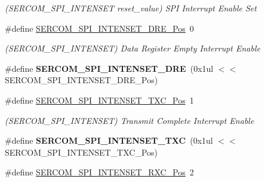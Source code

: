 \begin{DoxyCompactItemize}
\begin{DoxyCompactList}\small\item\em (S\+E\+R\+C\+O\+M\+\_\+\+S\+P\+I\+\_\+\+I\+N\+T\+E\+N\+S\+E\+T reset\+\_\+value) S\+P\+I Interrupt Enable Set \end{DoxyCompactList}\item 
\hypertarget{group___s_a_m_l21___s_e_r_c_o_m_ga4d3dd9b4afaf166511e045cfa97c93e8}{}\#define \hyperlink{group___s_a_m_l21___s_e_r_c_o_m_ga4d3dd9b4afaf166511e045cfa97c93e8}{S\+E\+R\+C\+O\+M\+\_\+\+S\+P\+I\+\_\+\+I\+N\+T\+E\+N\+S\+E\+T\+\_\+\+D\+R\+E\+\_\+\+Pos}~0\label{group___s_a_m_l21___s_e_r_c_o_m_ga4d3dd9b4afaf166511e045cfa97c93e8}

\begin{DoxyCompactList}\small\item\em (S\+E\+R\+C\+O\+M\+\_\+\+S\+P\+I\+\_\+\+I\+N\+T\+E\+N\+S\+E\+T) Data Register Empty Interrupt Enable \end{DoxyCompactList}\item 
\hypertarget{group___s_a_m_l21___s_e_r_c_o_m_ga59f60265759e811922af7763f5d8219c}{}\#define {\bfseries S\+E\+R\+C\+O\+M\+\_\+\+S\+P\+I\+\_\+\+I\+N\+T\+E\+N\+S\+E\+T\+\_\+\+D\+R\+E}~(0x1ul $<$$<$ S\+E\+R\+C\+O\+M\+\_\+\+S\+P\+I\+\_\+\+I\+N\+T\+E\+N\+S\+E\+T\+\_\+\+D\+R\+E\+\_\+\+Pos)\label{group___s_a_m_l21___s_e_r_c_o_m_ga59f60265759e811922af7763f5d8219c}

\item 
\hypertarget{group___s_a_m_l21___s_e_r_c_o_m_ga41d273616f164fcb7126e894fb240a50}{}\#define \hyperlink{group___s_a_m_l21___s_e_r_c_o_m_ga41d273616f164fcb7126e894fb240a50}{S\+E\+R\+C\+O\+M\+\_\+\+S\+P\+I\+\_\+\+I\+N\+T\+E\+N\+S\+E\+T\+\_\+\+T\+X\+C\+\_\+\+Pos}~1\label{group___s_a_m_l21___s_e_r_c_o_m_ga41d273616f164fcb7126e894fb240a50}

\begin{DoxyCompactList}\small\item\em (S\+E\+R\+C\+O\+M\+\_\+\+S\+P\+I\+\_\+\+I\+N\+T\+E\+N\+S\+E\+T) Transmit Complete Interrupt Enable \end{DoxyCompactList}\item 
\hypertarget{group___s_a_m_l21___s_e_r_c_o_m_ga9d9ea8d0b5aa9d3760a9ac8c937d0715}{}\#define {\bfseries S\+E\+R\+C\+O\+M\+\_\+\+S\+P\+I\+\_\+\+I\+N\+T\+E\+N\+S\+E\+T\+\_\+\+T\+X\+C}~(0x1ul $<$$<$ S\+E\+R\+C\+O\+M\+\_\+\+S\+P\+I\+\_\+\+I\+N\+T\+E\+N\+S\+E\+T\+\_\+\+T\+X\+C\+\_\+\+Pos)\label{group___s_a_m_l21___s_e_r_c_o_m_ga9d9ea8d0b5aa9d3760a9ac8c937d0715}

\item 
\hypertarget{group___s_a_m_l21___s_e_r_c_o_m_ga031fbb2fab0578fedc3c7c6a19a4c224}{}\#define \hyperlink{group___s_a_m_l21___s_e_r_c_o_m_ga031fbb2fab0578fedc3c7c6a19a4c224}{S\+E\+R\+C\+O\+M\+\_\+\+S\+P\+I\+\_\+\+I\+N\+T\+E\+N\+S\+E\+T\+\_\+\+R\+X\+C\+\_\+\+Pos}~2\label{group___s_a_m_l21___s_e_r_c_o_m_ga031fbb2fab0578fedc3c7c6a19a4c224}


\end{DoxyCompactItemize}
